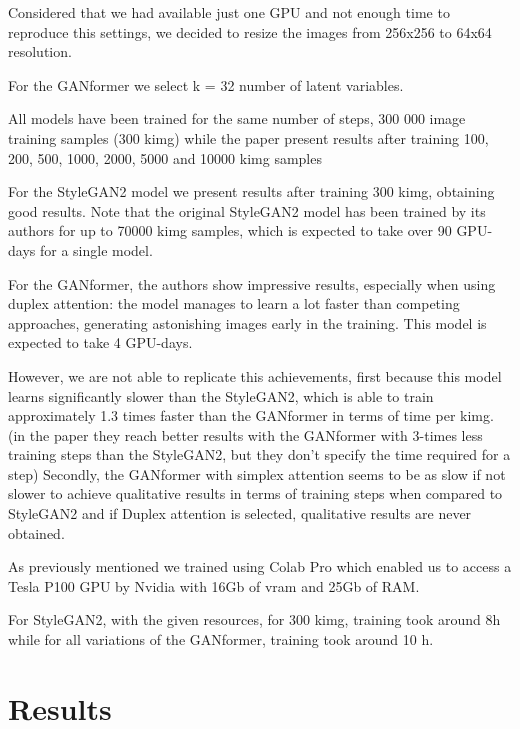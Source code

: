 \documentclass{article}
\begin{document}
Considered that we had available just one GPU and not enough time to reproduce this settings, we 
decided to resize the images from 256x256 to 64x64 resolution.


For the GANformer we select k = 32 number of latent variables. 

All models have been trained for the same number of steps, 300 000 image
training samples (300 kimg) while the paper present results after training 100, 200, 500, 1000, 2000, 
5000 and 10000 kimg samples

For the StyleGAN2 model we present results after training 300 kimg, obtaining 
good results.
Note that the original StyleGAN2 model has been trained by its authors \cite{karras2020analyzing} 
for up to 70000 kimg samples, which is expected to take over 90 GPU-days for a single model. 


For the GANformer, the authors \cite{karras2020analyzing} show impressive results, especially when 
using duplex attention: the model manages to learn a lot faster than competing approaches, 
generating astonishing images early in the training. This model is expected to take 4 GPU-days.

However, we are not able to replicate this achievements, first because this model learns significantly 
slower than the StyleGAN2, which is able to train approximately 
1.3 times faster than the GANformer in terms of time per kimg.
(in the paper they reach better results with the GANformer with 3-times less training steps than the 
StyleGAN2, but they don't specify the time required for a step)
Secondly, the GANformer with simplex attention seems to be as slow if not slower to achieve 
qualitative results
in terms of training steps when compared to StyleGAN2 and if Duplex attention is selected, 
qualitative results are never obtained.

As previously mentioned we trained using Colab Pro which enabled us to access a Tesla P100 GPU 
by Nvidia with 16Gb of vram 
and 25Gb of RAM.

For StyleGAN2, with the given resources, for 300 kimg, training took around 8h while for all 
variations of the GANformer, training took around 10 h.


\section{Results}\label{sec:results}
\end{document}
